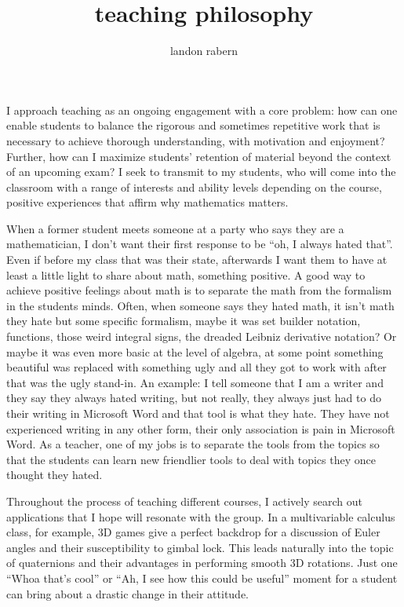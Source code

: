 \documentclass[12pt]{article}
\title{teaching philosophy}
\author{landon rabern}
\begin{document}
\maketitle
I approach teaching as an ongoing engagement with a core problem: how can one enable students to balance the rigorous and sometimes repetitive work that is necessary to 
achieve thorough understanding, with motivation and enjoyment? Further, how can I maximize students' retention of material beyond the context of an upcoming exam? 
I seek to transmit to my students, who will come into the classroom with a range of interests and ability levels depending on the course, positive experiences that 
affirm why mathematics matters.

When a former student meets someone at a party who says they are a mathematician, I don't want their first response to be ``oh, I always hated that''.  Even if before my
class that was their state, afterwards I want them to have at least a little light to share about math, something positive. A good way to achieve positive feelings about math is to separate the math from the formalism in the students minds.  Often, when someone says they hated math, it isn't math they hate
but some specific formalism, maybe it was set builder notation, functions, those weird integral signs, the dreaded Leibniz derivative notation?  Or maybe it was even more basic at
the level of algebra, at some point something beautiful was replaced with something ugly and all they got to work with after that was the ugly stand-in.  An example: I tell someone
that I am a writer and they say they always hated writing, but not really, they always just had to do their writing in Microsoft Word and that tool is what they hate.  They have
not experienced writing in any other form, their only association is pain in Microsoft Word.  As a teacher, one of my jobs is to separate the tools from the topics so that the students can 
learn new friendlier tools to deal with topics they once thought they hated.

Throughout the process of teaching different courses, I actively search out applications that I hope will resonate with the group. In a multivariable 
calculus class, for example, 3D games give a perfect backdrop for a discussion of Euler angles and their susceptibility to gimbal lock.  This leads naturally into the topic of quaternions 
and their advantages in performing smooth 3D rotations.  Just one ``Whoa that's cool'' or ``Ah, I see how this could be useful'' moment for a student can bring about a drastic change 
in their attitude.
\end{document}

